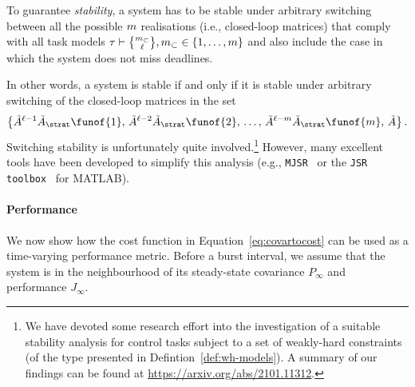 \begin{definition}%
    To guarantee \emph{\switchingstability{} stability}, a system has to be stable under arbitrary switching between all the possible $m$ realisations (i.e., closed-loop matrices) that comply with all task models $\tau \vdash \genfrac{\{}{\}}{0pt}{}{\nummisses_\subset}{\numtotalanalysed}, \nummisses_\subset \in \{1, \dots,\nummisses\}$ and also include the case in which the system does not miss deadlines.
\end{definition}
In other words, a system is \switchingstability{} stable if and only if it is stable under arbitrary switching of the closed-loop matrices in the set
%
\begin{equation}
    \left\{ \tilde A^{\numtotalanalysed-1}\tilde A_\strat\funof{1},\, \tilde A^{\numtotalanalysed-2}\tilde A_\strat\funof{2},\, \ldots,\, \tilde A^{\numtotalanalysed-\nummisses}\tilde A_\strat\funof{\nummisses},\, \tilde A \right\}.
\end{equation}
%
Switching stability is unfortunately quite involved.\footnote{We have devoted some research effort into the investigation of a suitable stability analysis for control tasks subject to a set of weakly-hard constraints (of the type presented in Defintion~\ref{def:wh-models}). A summary of our findings can be found at \url{https://arxiv.org/abs/2101.11312}.}
However, many excellent tools have been developed to simplify this analysis (e.g., \texttt{MJSR}~\cite{Maggio:2020} or the \texttt{JSR toolbox}~\cite{Jungers:2014} for MATLAB).

\paragraph*{Performance}%

We now show how the cost function in Equation~\eqref{eq:covartocost} can be used as a time-varying performance metric.
Before a burst interval, we assume that the system is in the neighbourhood of its steady-state covariance $P_\infty$ and performance $J_\infty$.

